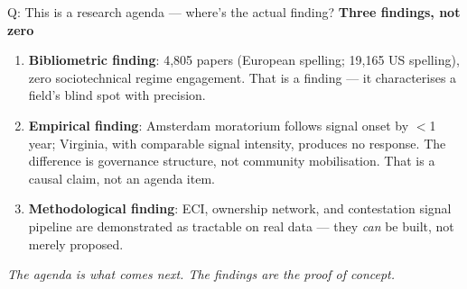 \documentclass[aspectratio=169,11pt]{beamer}
\begin{document}
\begin{frame}[noframenumbering]{\enspace Q: This is a research agenda — where's the actual finding?}
\small\textbf{Three findings, not zero}\\[0.4em]
\footnotesize
\begin{enumerate}
  \item \textbf{Bibliometric finding}: 4,805 papers (European spelling; 19,165 US spelling), zero sociotechnical regime engagement. That is a finding — it characterises a field's blind spot with precision.
  \item \textbf{Empirical finding}: Amsterdam moratorium follows signal onset by $<$1 year; Virginia, with comparable signal intensity, produces no response. The difference is governance structure, not community mobilisation. That is a causal claim, not an agenda item.
  \item \textbf{Methodological finding}: ECI, ownership network, and contestation signal pipeline are demonstrated as tractable on real data — they \textit{can} be built, not merely proposed.
\end{enumerate}
\vspace{0.3em}
\textcolor{dcgray}{\textit{The agenda is what comes next. The findings are the proof of concept.}}
\end{frame}
\end{document}
